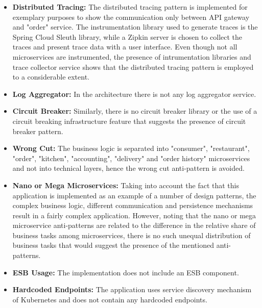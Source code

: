 \documentclass{Configuration_Files/PoliMi3i_thesis}
\begin{document}
\begin{itemize}
    \item \textbf{Distributed Tracing:} The distributed tracing pattern is implemented for exemplary purposes to show the communication only between API gateway and "order" service.
    The instrumentation library used to generate traces is the Spring Cloud Sleuth\footnotemark[93] library, while a Zipkin server is chosen to collect the traces and present trace data with a user interface.
    Even though not all microservices are instrumented, the presence of intrumentation libraries and trace collector service shows that the distributed tracing pattern is employed to a considerable extent.
    
    \item \textbf{Log Aggregator:} In the architecture there is not any log aggregator service.
    
    \item \textbf{Circuit Breaker:} Similarly, there is no circuit breaker library or the use of a circuit breaking infrastructure feature that suggests the presence of circuit breaker pattern.
    
    \item \textbf{Wrong Cut:} The business logic is separated into "consumer", "restaurant", "order", "kitchen", "accounting", "delivery" and "order history" microservices and not into technical layers, hence the wrong cut anti-pattern is avoided.
    
    \item \textbf{Nano or Mega Microservices:} Taking into account the fact that this application is implemented as an example of a number of design patterns, the complex business logic, different communication and persistence mechanisms result in a fairly complex application.
    However, noting that the nano or mega microservice anti-patterns are related to the difference in the relative share of business tasks among microservices, there is no such unequal distribution of business tasks that would suggest the presence of the mentioned anti-patterns.
    
    \item \textbf{ESB Usage:} The implementation does not include an ESB component.
    
    \item \textbf{Hardcoded Endpoints:} The application uses service discovery mechanism of Kubernetes and does not contain any hardcoded endpoints.
    

\end{itemize}
\end{document}
